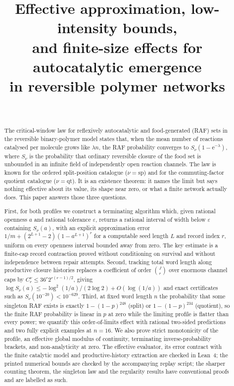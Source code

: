 \documentclass[11pt,a4paper]{article}
\title{Effective approximation, low-intensity bounds,\\ and finite-size effects for autocatalytic emergence\\ in reversible polymer networks}
\author{\PaperAuthor\\ \PaperAffiliation}
\date{\PaperDate}
\theoremstyle{plain}
\theoremstyle{definition}
\theoremstyle{remark}
\newcommand{\qt}{\mathrm{qt}}
\newcommand{\spc}{\mathrm{sp}}
\newcommand{\eps}{\varepsilon}
\newcommand{\ee}{\mathrm{e}}
\begin{document}
\maketitle

\begin{abstract}
The critical-window law for reflexively autocatalytic and food-generated (RAF) sets in the reversible binary-polymer model states that, when the mean number of reactions catalysed per molecule grows like $\lambda n$, the RAF probability converges to $S_\nu(1-\ee^{-\lambda})$, where $S_\nu$ is the probability that ordinary reversible closure of the food set is unbounded in an infinite field of independently open reaction channels. The law is known for the ordered split-position catalogue ($\nu=\spc$) and for the commuting-factor quotient catalogue ($\nu=\qt$). It is an existence theorem: it names the limit but says nothing effective about its value, its shape near zero, or what a finite network actually does. This paper answers those three questions.

First, for both profiles we construct a terminating algorithm which, given rational openness $a$ and rational tolerance $\eps$, returns a rational interval of width below $\eps$ containing $S_\nu(a)$, with an explicit approximation error $1/m+(2^{L+1}-2)(1-a^{L+1})^r$ for a computable seed length $L$ and record index $r$, uniform on every openness interval bounded away from zero. The key estimate is a finite-cap record contraction proved without conditioning on survival and without independence between repair attempts. Second, tracking total word length along productive closure histories replaces a coefficient of order $\binom{J}{r}$ over enormous channel caps by $C_r^\nu\le36^r2^{r(r-1)/2}$, giving $\log S_\nu(a)\le-\log^2(1/a)/(2\log2)+O(\log(1/a))$ and exact certificates such as $S_\nu(10^{-20})<10^{-629}$. Third, at fixed word length $n$ the probability that some singleton RAF exists is exactly $1-(1-p)^{248}$ (split) or $1-(1-p)^{234}$ (quotient), so the finite RAF probability is linear in $p$ at zero while the limiting profile is flatter than every power; we quantify this order-of-limits effect with rational two-sided predictions and two fully explicit examples at $n=16$. We also prove strict monotonicity of the profile, an effective global modulus of continuity, terminating inverse-probability brackets, and non-analyticity at zero. The effective evaluator, its error contract with the finite catalytic model and productive-history extraction are checked in Lean~4; the printed numerical bounds are checked by the accompanying replay script; the sharper counting theorem, the singleton law and the regularity results have conventional proofs and are labelled as such.
\end{abstract}
\end{document}
